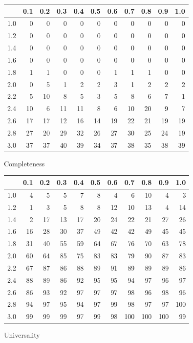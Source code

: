 \begin{figure}
  \centering
  \hfil
  \renewcommand{\tabcolsep}{0.1cm}
  \begin{subtable}[t]{0.45\textwidth}
  \begin{tabular}{r|rrrrrrrrrr}
  & 0.1 & 0.2 & 0.3 & 0.4 & 0.5 & 0.6 & 0.7 & 0.8 & 0.9 & 1.0 \\ 
  \hline
  1.0 & 0 & 0 & 0 & 0 & 0 & 0 & 0 & 0 & 0 & 0 \\ 
  1.2 & 0 & 0 & 0 & 0 & 0 & 0 & 0 & 0 & 0 & 0 \\ 
  1.4 & 0 & 0 & 0 & 0 & 0 & 0 & 0 & 0 & 0 & 0 \\ 
  1.6 & 0 & 0 & 0 & 0 & 0 & 0 & 0 & 0 & 0 & 0 \\ 
  1.8 & 1 & 1 & 0 & 0 & 0 & 1 & 1 & 1 & 0 & 0 \\ 
  2.0 & 0 & 5 & 1 & 2 & 2 & 3 & 1 & 2 & 2 & 2 \\ 
  2.2 & 5 & 10 & 8 & 5 & 3 & 5 & 8 & 6 & 7 & 1 \\ 
  2.4 & 10 & 6 & 11 & 11 & 8 & 6 & 10 & 20 & 9 & 7 \\ 
  2.6 & 17 & 17 & 12 & 16 & 14 & 19 & 22 & 21 & 19 & 19 \\ 
  2.8 & 27 & 20 & 29 & 32 & 26 & 27 & 30 & 25 & 24 & 19 \\ 
  3.0 & 37 & 37 & 40 & 39 & 34 & 37 & 38 & 35 & 38 & 39 \\ 
  \end{tabular}
  \caption{Completeness}
  \end{subtable}
  \hfill
  \begin{subtable}[t]{0.45\textwidth}
  \begin{tabular}{r|rrrrrrrrrr}
   & 0.1 & 0.2 & 0.3 & 0.4 & 0.5 & 0.6 & 0.7 & 0.8 & 0.9 & 1.0 \\ 
  \hline
  1.0 & 4 & 5 & 5 & 7 & 8 & 4 & 6 & 10 & 4 & 3 \\ 
  1.2 & 1 & 3 & 5 & 8 & 8 & 12 & 10 & 13 & 4 & 14 \\ 
  1.4 & 2 & 17 & 13 & 17 & 20 & 24 & 22 & 21 & 27 & 26 \\ 
  1.6 & 16 & 28 & 30 & 37 & 49 & 42 & 42 & 49 & 45 & 45 \\ 
  1.8 & 31 & 40 & 55 & 59 & 64 & 67 & 76 & 70 & 63 & 78 \\ 
  2.0 & 60 & 64 & 85 & 75 & 83 & 83 & 79 & 90 & 87 & 83 \\ 
  2.2 & 67 & 87 & 86 & 88 & 89 & 91 & 89 & 89 & 89 & 86 \\ 
  2.4 & 88 & 89 & 86 & 92 & 95 & 95 & 94 & 97 & 96 & 97 \\ 
  2.6 & 86 & 93 & 92 & 97 & 97 & 97 & 98 & 96 & 98 & 96 \\ 
  2.8 & 94 & 97 & 95 & 94 & 97 & 99 & 98 & 97 & 97 & 100 \\ 
  3.0 & 99 & 99 & 99 & 97 & 99 & 98 & 100 & 100 & 100 & 99 \\ 
  \end{tabular}
  \caption{Universality}
  \end{subtable}
  \renewcommand{\tabcolsep}{0.2cm}
  \hfil


\end{figure}
